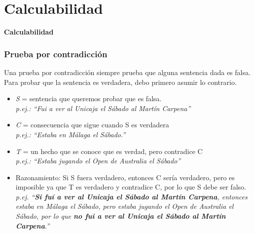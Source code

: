 \documentclass[xcolor=table]{beamer}
\begin{document}
\section{Calculabilidad}
\begin{frame}  \Large

\begin{center}
    \textbf{Calculabilidad}
\end{center}

\end{frame} 

\begin{frame}  \frametitle{Prueba por contradicción}\small  

Una prueba por contradicción siempre prueba que alguna sentencia dada es falsa. Para probar que la sentencia es verdadera, debo primero asumir lo contrario.

\scriptsize 
\begin{itemize}
    \item \textit{S} = sentencia que queremos probar que es falsa. \\ \textit{p.ej.: “Fui a ver al Unicaja el Sábado al Martín Carpena”}
    \item \textit{C} = consecuencia que sigue cuando S es verdadera \\ \textit{p.ej.: “Estaba en Málaga el Sábado.”}
    \item \textit{T} = un hecho que se conoce que es verdad, pero contradice C 
    \\ \textit{p.ej.: “Estaba jugando el Open de Australia  el Sábado”}
    \item Razonamiento: Si S fuera verdadero, entonces C sería verdadero, pero es imposible ya que T es verdadero y contradice C, por lo que S debe ser falso. 
    \\ \textit{p.ej. “\textbf{Si fuí a ver al Unicaja el Sábado al Martín Carpena}, entonces estaba en Málaga el Sábado, pero estaba  jugando el Open de Australia  el Sábado, por lo que \textbf{no fui a ver al Unicaja el Sábado al Martín Carpena}.”}

\end{itemize}



\end{frame} 
\end{document}
